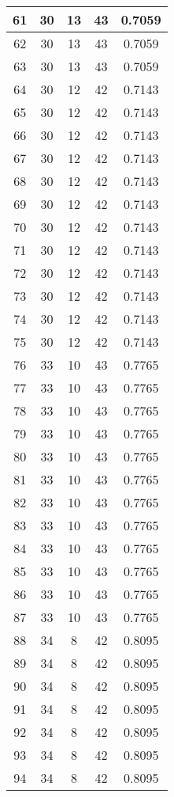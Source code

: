 \documentclass[letterpaper, 12pt]{article}
\begin{document}
\begin{longtable}{|c|c|c|c|c|}
\hline
61 & 30 & 13 & 43 & 0.7059 \\
\hline
62 & 30 & 13 & 43 & 0.7059 \\
\hline
63 & 30 & 13 & 43 & 0.7059 \\
\hline
64 & 30 & 12 & 42 & 0.7143 \\
\hline
65 & 30 & 12 & 42 & 0.7143 \\
\hline
66 & 30 & 12 & 42 & 0.7143 \\
\hline
67 & 30 & 12 & 42 & 0.7143 \\
\hline
68 & 30 & 12 & 42 & 0.7143 \\
\hline
69 & 30 & 12 & 42 & 0.7143 \\
\hline
70 & 30 & 12 & 42 & 0.7143 \\
\hline
71 & 30 & 12 & 42 & 0.7143 \\
\hline
72 & 30 & 12 & 42 & 0.7143 \\
\hline
73 & 30 & 12 & 42 & 0.7143 \\
\hline
74 & 30 & 12 & 42 & 0.7143 \\
\hline
75 & 30 & 12 & 42 & 0.7143 \\
\hline
76 & 33 & 10 & 43 & 0.7765 \\
\hline
77 & 33 & 10 & 43 & 0.7765 \\
\hline
78 & 33 & 10 & 43 & 0.7765 \\
\hline
79 & 33 & 10 & 43 & 0.7765 \\
\hline
80 & 33 & 10 & 43 & 0.7765 \\
\hline
81 & 33 & 10 & 43 & 0.7765 \\
\hline
82 & 33 & 10 & 43 & 0.7765 \\
\hline
83 & 33 & 10 & 43 & 0.7765 \\
\hline
84 & 33 & 10 & 43 & 0.7765 \\
\hline
85 & 33 & 10 & 43 & 0.7765 \\
\hline
86 & 33 & 10 & 43 & 0.7765 \\
\hline
87 & 33 & 10 & 43 & 0.7765 \\
\hline
88 & 34 & 8 & 42 & 0.8095 \\
\hline
89 & 34 & 8 & 42 & 0.8095 \\
\hline
90 & 34 & 8 & 42 & 0.8095 \\
\hline
91 & 34 & 8 & 42 & 0.8095 \\
\hline
92 & 34 & 8 & 42 & 0.8095 \\
\hline
93 & 34 & 8 & 42 & 0.8095 \\
\hline
94 & 34 & 8 & 42 & 0.8095 \\

\end{longtable}
\end{document}
